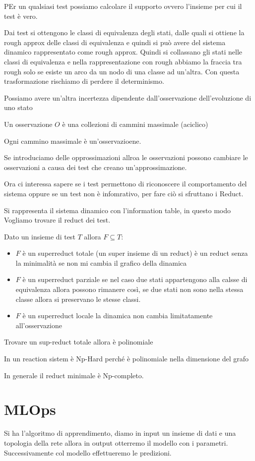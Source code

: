 PEr un qualsiasi test possiamo calcolare il supporto ovvero l'insieme per cui il 
test è vero.

Dai test si ottengono le classi di equivalenza degli stati, dalle quali si ottiene 
la rough approx delle classi di equivalenza e quindi si può avere del sistema dinamico 
rappresentato come rough approx. Quindi si collassano gli stati nelle classi di 
equivalenza e nella rappresentazione con rough abbiamo la fraccia tra rough solo 
se esiste un arco da un nodo di una classe ad un'altra. Con questa trasformazione 
rischiamo di perdere il determinismo.

Possiamo avere un'altra incertezza dipendente dall'osservazione dell'evoluzione 
di uno stato
\begin{definizione}
    Un osservazione $O$ è una collezioni di cammini massimale (aciclico) 
\end{definizione}
Ogni cammino massimale è un'osservazioene.

Se introduciamo delle opprossimazioni allroa le osservazioni possono cambiare 
le osservazioni a causa dei test che creano un'approssimazione.

Ora ci interessa sapere se i test permettono di riconoscere il comportamento del 
sistema oppure se un test non è infomrativo, per fare ciò si sfruttano i Reduct.

Si rappresenta il sistema dinamico con l'information table, in questo modo Vogliamo
trovare il reduct dei test.

Dato un insieme di test  $T$ allora $F\subseteq T$:
\begin{itemize}
    \item $F$ è un superreduct totale (un super insieme di un reduct) è un reduct 
    senza la minimalità se non mi cambia il grafico della dinamica
    \item $F$ è un superreduct parziale se nel caso due stati appartengono alla calsse 
    di equivalenza allora possono rimanere così, se due stati non sono nella stessa classe 
    allora si preservano le stesse classi.
    \item $F$ è un superreduct locale la dinamica non cambia limitatamente all'osservazione
\end{itemize} 
Trovare un sup-reduct totale allora è polinomiale 

In un reaction sistem è Np-Hard perché è polinomiale nella dimensione del grafo 

In generale il reduct minimale è Np-completo.


\section{MLOps}
Si ha l'algoritmo di apprendimento, diamo in input un insieme di dati e una topologia della rete allora in output 
otterremo il modello con i parametri. Successivamente col modello effettueremo le predizioni.


